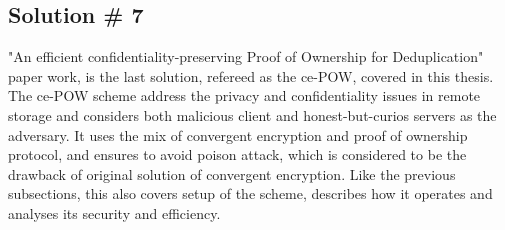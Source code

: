 \documentclass[12pt]{article}
\begin{document}
 


\subsection{Solution \# 7}
\label{sub:Soltuion7}
"An efficient confidentiality-preserving Proof of Ownership for Deduplication" paper work\cite{ce-POW},  is the last solution, refereed as the ce-POW, covered in this thesis. The ce-POW scheme address the privacy and confidentiality issues in remote storage and considers both malicious client and honest-but-curios servers as the adversary. It uses the mix of convergent encryption and proof of ownership protocol, and ensures to avoid poison attack, which is considered to be the drawback of original solution of convergent encryption. Like the previous subsections, this also  covers setup of the scheme, describes how it operates and analyses its security and efficiency. 
\end{document}
